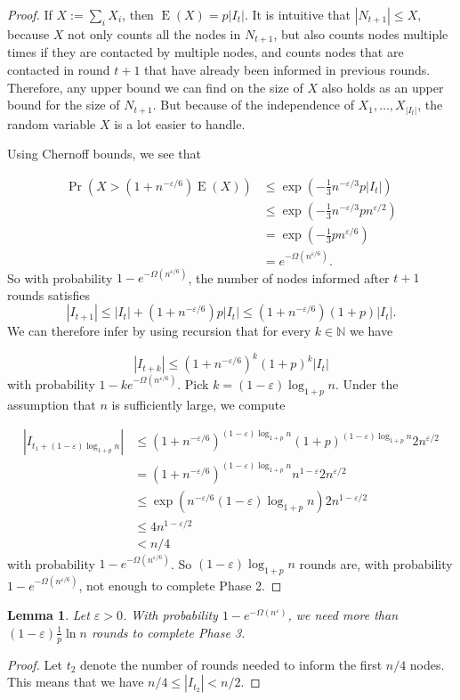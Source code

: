 \documentclass[12pt]{article}
\newtheorem{lemma}[theorem]{Lemma}
\newcommand{\e}{\varepsilon}
\DeclareMathOperator{\E}{E}
\newcommand{\N}{{\mathbb{N}}}
\begin{document}
{\begin{proof}
If $X:=\sum_iX_i$, then $\E(X)=p|I_t|$. 
It is intuitive that $|N_{t+1}|\leq X$, because $X$ not only counts all the nodes in $N_{t+1}$, but also counts nodes multiple times if they are contacted by multiple nodes, and counts nodes that are contacted in round $t+1$ that have already been informed in  previous rounds. 
Therefore, any upper bound we can find on the size of $X$ also holds as an upper bound for the size of $N_{t+1}$. 
But because of the independence of $X_1,\dots , X_{|I_t|}$, the random variable $X$ is a lot easier to handle.


Using Chernoff bounds, we see that

\begin{align*}
\Pr\left(X>(1+n^{-\e/6})\E(X)	\right)
& \leq\exp\left(-\tfrac{1}{3}n^{-\e/3}p|I_t|\right)\\
& \leq\exp\left(-\tfrac{1}{3}n^{-\e/3}pn^{\e/2}\right)\\
& =\exp\left(-\tfrac{1}{3}pn^{\e/6}\right)\\
& =e^{-\Omega(n^{\e/6})}.
\end{align*}
So with probability $1-e^{-\Omega(n^{\e/6})}$, the number of nodes informed after $t+1$ rounds satisfies $$|I_{t+1}|\leq |I_t|+(1+n^{-\e/6})p|I_t|\leq (1+n^{-\e/6})(1+p)|I_t|.$$ We can therefore infer by using recursion that for every $k\in \N$ we have

\begin{equation*}
|I_{t+k}|\leq (1+n^{-\e/6})^k(1+p)^k|I_t|
\end{equation*}
with probability $1-ke^{-\Omega(n^{\e/6})}$.
Pick $k = (1-\e)\log_{1+p}n$. Under the assumption that $n$ is sufficiently large, we compute

\begin{align*}
 |I_{t_1+(1-\e)\log_{1+p}n}|&\leq (1+n^{-\e/6})^{(1-\e)\log_{1+p}n}(1+p)^{(1-\e)\log_{1+p}n}2n^{\e/2}\\
&=(1+n^{-\e/6})^{(1-\e)\log_{1+p}n}n^{1-\e}2n^{\e/2}\\
&\leq \exp\left(n^{-\e/6}(1-\e)\log_{1+p}n\right)2n^{1-\e/2}\\
&\leq 4n^{1-\e/2}\\
&< n/4
\end{align*}
with probability $1-e^{-\Omega(n^{\e/6})}$.
So $(1-\e)\log_{1+p}n$ rounds are, with probability $1-e^{-\Omega(n^{\e/6})}$, not enough to complete Phase 2.
\end{proof}


\begin{lemma}\label{RandomPhase3}
Let $\e > 0$. With probability $1- e^{-\Omega(n^\e)}$, we need more than $(1-\e)\frac{1}{p}\ln n$ rounds to complete Phase 3.
\end{lemma}
\begin{proof}
Let $t_2$ denote the number of rounds needed to inform the first $n/4$ nodes. 
This means that we have $n/4 \leq |I_{t_2}| < n/2$.


\end{proof}}
\end{document}
